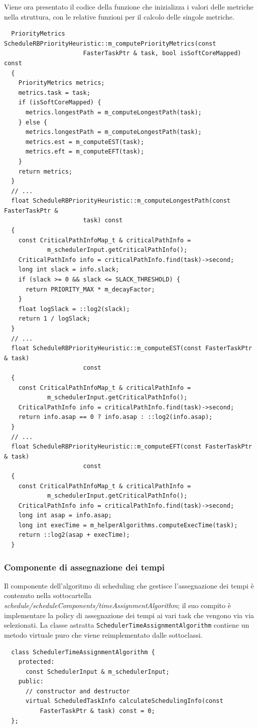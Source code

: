 Viene ora presentato il codice della funzione che inizializza i valori delle 
metriche nella struttura, con le relative funzioni per il calcolo delle singole 
metriche.
\newline
\begin{verbatim}
  PriorityMetrics ScheduleRBPriorityHeuristic::m_computePriorityMetrics(const 
                      FasterTaskPtr & task, bool isSoftCoreMapped) const
  {
    PriorityMetrics metrics;
    metrics.task = task;
    if (isSoftCoreMapped) {
      metrics.longestPath = m_computeLongestPath(task);
    } else {
      metrics.longestPath = m_computeLongestPath(task);
      metrics.est = m_computeEST(task);
      metrics.eft = m_computeEFT(task);
    }
    return metrics;
  }
  // ...
  float ScheduleRBPriorityHeuristic::m_computeLongestPath(const FasterTaskPtr & 
                      task) const
  {
    const CriticalPathInfoMap_t & criticalPathInfo = 
            m_schedulerInput.getCriticalPathInfo();
    CriticalPathInfo info = criticalPathInfo.find(task)->second;
    long int slack = info.slack;
    if (slack >= 0 && slack <= SLACK_THRESHOLD) {
      return PRIORITY_MAX * m_decayFactor;
    }
    float logSlack = ::log2(slack);
    return 1 / logSlack;
  }
  // ...
  float ScheduleRBPriorityHeuristic::m_computeEST(const FasterTaskPtr & task) 
                      const
  {
    const CriticalPathInfoMap_t & criticalPathInfo = 
            m_schedulerInput.getCriticalPathInfo();
    CriticalPathInfo info = criticalPathInfo.find(task)->second;
    return info.asap == 0 ? info.asap : ::log2(info.asap);
  }
  // ...
  float ScheduleRBPriorityHeuristic::m_computeEFT(const FasterTaskPtr & task) 
                      const
  {
    const CriticalPathInfoMap_t & criticalPathInfo = 
            m_schedulerInput.getCriticalPathInfo();
    CriticalPathInfo info = criticalPathInfo.find(task)->second;
    long int asap = info.asap;
    long int execTime = m_helperAlgorithms.computeExecTime(task);
    return ::log2(asap + execTime);
  }
\end{verbatim}


\subsubsection{Componente di assegnazione dei tempi}
Il componente dell'algoritmo di scheduling che gestisce l'assegnazione dei 
tempi è contenuto nella sottocartella 
\emph{schedule/scheduleComponents/timeAssignmentAlgorithm}; il suo compito è 
implementare la policy di assegnazione dei tempi ai vari task che vengono via 
via selezionati. La classe astratta \verb+SchedulerTimeAssignmentAlgorithm+ 
contiene un metodo virtuale puro che viene reimplementato dalle sottoclassi.
\newline
\begin{verbatim}
  class SchedulerTimeAssignmentAlgorithm {
    protected:
      const SchedulerInput & m_schedulerInput;
    public:
      // constructor and destructor
      virtual ScheduledTaskInfo calculateSchedulingInfo(const 
          FasterTaskPtr & task) const = 0;
  };
\end{verbatim}


